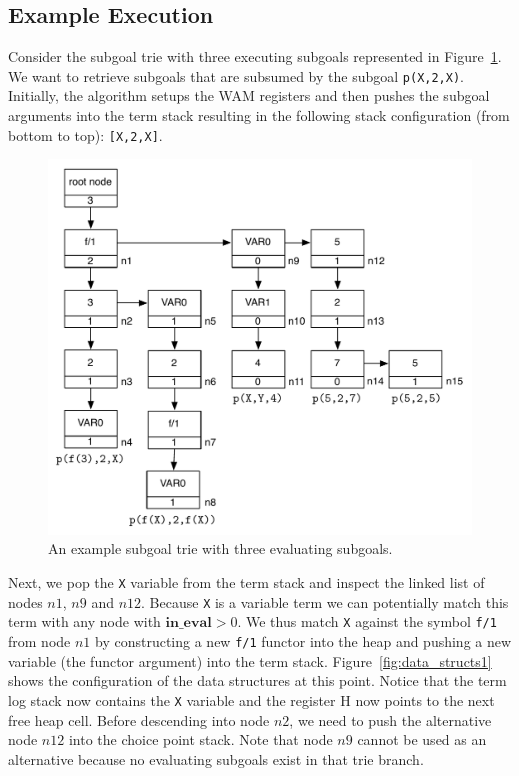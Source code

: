 \subsection{Example Execution}

Consider the subgoal trie with three executing subgoals represented in
Figure~\ref{fig:example_trie}. We want to retrieve subgoals that are
subsumed by the subgoal \texttt{p(X,2,X)}. Initially, the algorithm setups
the WAM registers and then pushes the subgoal arguments into the term stack
resulting in the following stack configuration (from bottom to top): \texttt{[X,2,X]}.

\begin{figure}[ht]
\centering
\includegraphics[scale=0.6]{example_trie}
\caption{An example subgoal trie with three evaluating subgoals.}
\label{fig:example_trie}
\end{figure}

Next, we pop the \texttt{X} variable from the term stack and inspect the linked
list of nodes $n1$, $n9$ and $n12$. Because \texttt{X} is a variable term we can potentially
match this term with any node with $\textbf{in\_eval} > 0$. We thus match \texttt{X} against
the symbol \texttt{f/1} from node $n1$ by constructing a new \texttt{f/1} functor
into the heap and pushing a new variable (the functor argument) into the term stack.
Figure~\ref{fig:data_structs1} shows the configuration of the data structures at this point.
Notice that the term log stack now contains the \texttt{X} variable and
the register H now points to the next free heap cell.
Before descending into node $n2$, we need to push the alternative node $n12$ into the choice
point stack. Note that node $n9$ cannot be used as an alternative because no
evaluating subgoals exist in that trie branch.

